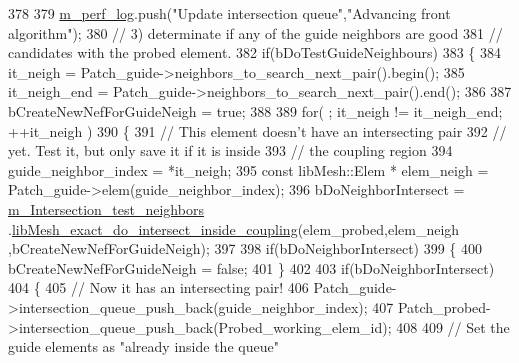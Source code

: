 \begin{DoxyCode}
378 
379                     \hyperlink{classcarl_1_1_intersection___search_aebe6210287a36909206b1a59f9cd17e0}{m\_perf\_log}.push(\textcolor{stringliteral}{"Update intersection queue"},\textcolor{stringliteral}{"Advancing front algorithm"});
380                     \textcolor{comment}{// 3) determinate if any of the guide neighbors are good}
381                     \textcolor{comment}{//    candidates with the probed element.}
382                     \textcolor{keywordflow}{if}(bDoTestGuideNeighbours)
383                     \{
384                         it\_neigh = Patch\_guide->neighbors\_to\_search\_next\_pair().begin();
385                         it\_neigh\_end = Patch\_guide->neighbors\_to\_search\_next\_pair().end();
386 
387                         bCreateNewNefForGuideNeigh = \textcolor{keyword}{true};
388 
389                         \textcolor{keywordflow}{for}( ; it\_neigh != it\_neigh\_end; ++it\_neigh )
390                         \{
391                             \textcolor{comment}{// This element doesn't have an intersecting pair}
392                             \textcolor{comment}{// yet. Test it, but only save it if it is inside}
393                             \textcolor{comment}{// the coupling region}
394                             guide\_neighbor\_index = *it\_neigh;
395                             \textcolor{keyword}{const} libMesh::Elem * elem\_neigh = Patch\_guide->elem(guide\_neighbor\_index);
396                             bDoNeighborIntersect = \hyperlink{classcarl_1_1_intersection___search_a7abbfa5dc5892d9179b93563320d533b}{m\_Intersection\_test\_neighbors}
      .\hyperlink{classcarl_1_1_intersection___tools_a98929a97acb94aa77fc8952d80993d88}{libMesh\_exact\_do\_intersect\_inside\_coupling}(elem\_probed,elem\_neigh
      ,bCreateNewNefForGuideNeigh);
397 
398                             \textcolor{keywordflow}{if}(bDoNeighborIntersect)
399                             \{
400                                 bCreateNewNefForGuideNeigh = \textcolor{keyword}{false};
401                             \}
402 
403                             \textcolor{keywordflow}{if}(bDoNeighborIntersect)
404                             \{
405                                 \textcolor{comment}{// Now it has an intersecting pair!}
406                                 Patch\_guide->intersection\_queue\_push\_back(guide\_neighbor\_index);
407                                 Patch\_probed->intersection\_queue\_push\_back(Probed\_working\_elem\_id);
408 
409                                 \textcolor{comment}{// Set the guide elements as "already inside the queue"}

\end{DoxyCode}
